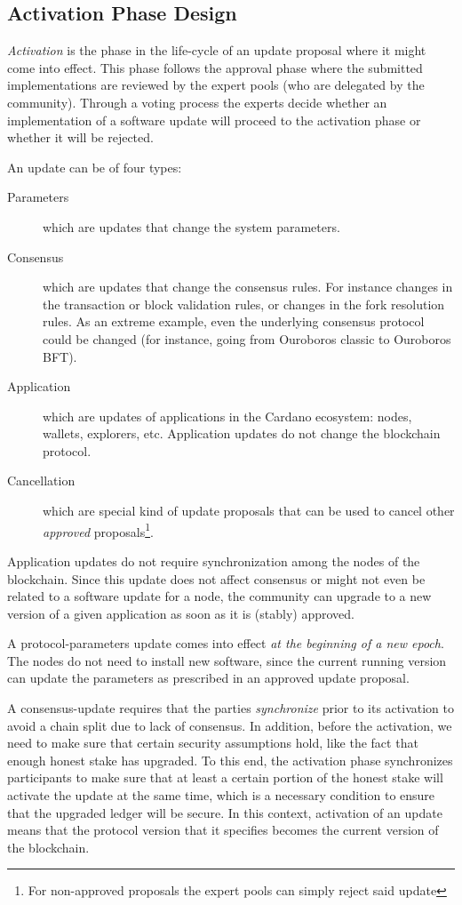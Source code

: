 \subsection{Activation Phase Design}\label{activation_phase_design}

\emph{Activation} is the phase in the life-cycle of an update proposal where it
might come into effect.
%
This phase follows the approval phase where the submitted implementations are
reviewed by the expert pools (who are delegated by the community).
%
Through a voting process the experts decide whether an implementation of a
software update will proceed to the activation phase or whether it will be
rejected.

An update can be of four types:
\begin{description}
	\item[Parameters] which are updates that change the system parameters.
	\item[Consensus] which are updates that change the consensus rules. For 
	instance
	changes in the transaction or block validation rules, or changes in the fork
	resolution rules. As an extreme example, even the underlying consensus
	protocol could be changed (for instance, going from Ouroboros classic to
	Ouroboros BFT).
	\item[Application] which are updates of applications in the Cardano 
	ecosystem:
	nodes, wallets, explorers, etc. Application updates do not change the
	blockchain protocol.
	\item[Cancellation] which are special kind of update proposals that can be 
	used
	to cancel other \emph{approved} proposals\footnote{For non-approved 
	proposals
		the expert pools can simply reject said update}.
\end{description}

Application updates do not require synchronization among the nodes of the
blockchain. Since this update does not affect consensus or might not even be
related to a software update for a node, the community can upgrade to a new
version of a given application as soon as it is (stably) approved.

A protocol-parameters update comes into effect \emph{at the beginning of a new
	epoch}. The nodes do not need to install new software, since the current
running version can update the parameters as prescribed in an approved update
proposal.

A consensus-update requires that the parties \emph{synchronize} prior to its
activation to avoid a chain split due to lack of consensus. In addition, before
the activation, we need to make sure that certain security assumptions hold,
like the fact that enough honest stake has upgraded.
%
To this end, the activation phase synchronizes participants to make sure that at
least a certain portion of the honest stake will activate the update at the same
time, which is a necessary condition to ensure that the upgraded ledger will be
secure.
%
In this context, activation of an update means that the protocol version that it
specifies becomes the current version of the blockchain.

